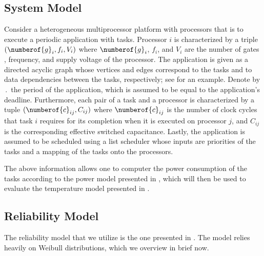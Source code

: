 \subsection{System Model}

Consider a heterogeneous multiprocessor platform with \np processors that is to
execute a periodic application with \nt tasks. Processor $i$ is characterized by
a triple $(\numberof{g}_i, f_i, V_i)$ where $\numberof{g}_i$, $f_i$, and $V_i$
are the number of gates \cite{liao2005}, frequency, and supply voltage of the
processor. The application is given as a directed acyclic graph whose vertices
and edges correspond to the tasks and to data dependencies between the tasks,
respectively; see  for an example. Denote by
$\period$ the period of the application, which is assumed to be equal to the
application's deadline. Furthermore, each pair of a task and a processor is
characterized by a tuple $(\numberof{c}_{ij}, C_{ij})$ where $\numberof{c}_{ij}$
is the number of clock cycles that task $i$ requires for its completion when it
is executed on processor $j$, and $C_{ij}$ is the corresponding effective
switched capacitance. Lastly, the application is assumed to be scheduled using a
list scheduler whose inputs are priorities of the tasks and a mapping of the
tasks onto the processors.

The above information allows one to computer the power consumption of the tasks
according to the power model presented in , which will then be
used to evaluate the temperature model presented in .

\subsection{Reliability Model}
\newcommand{\mean}{\mu}
\newcommand{\scale}{\eta}
\newcommand{\shape}{\beta}

The reliability model that we utilize is the one presented in \cite{huang2009,
xiang2010}. The model relies heavily on Weibull distributions, which we overview
in brief now.

